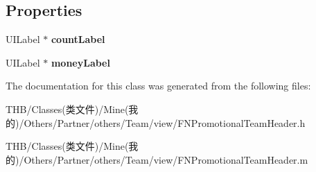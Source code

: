 \subsection*{Properties}
\begin{DoxyCompactItemize}
\item 
\mbox{\label{interface_f_n_promotional_team_header_aa4274b3b954c634baffd87fde853c59c}} 
U\+I\+Label $\ast$ {\bfseries count\+Label}
\item 
\mbox{\label{interface_f_n_promotional_team_header_ae542845ed83993335bc7467a5d280890}} 
U\+I\+Label $\ast$ {\bfseries money\+Label}
\end{DoxyCompactItemize}


The documentation for this class was generated from the following files\+:\begin{DoxyCompactItemize}
\item 
T\+H\+B/\+Classes(类文件)/\+Mine(我的)/\+Others/\+Partner/others/\+Team/view/F\+N\+Promotional\+Team\+Header.\+h\item 
T\+H\+B/\+Classes(类文件)/\+Mine(我的)/\+Others/\+Partner/others/\+Team/view/F\+N\+Promotional\+Team\+Header.\+m\end{DoxyCompactItemize}
